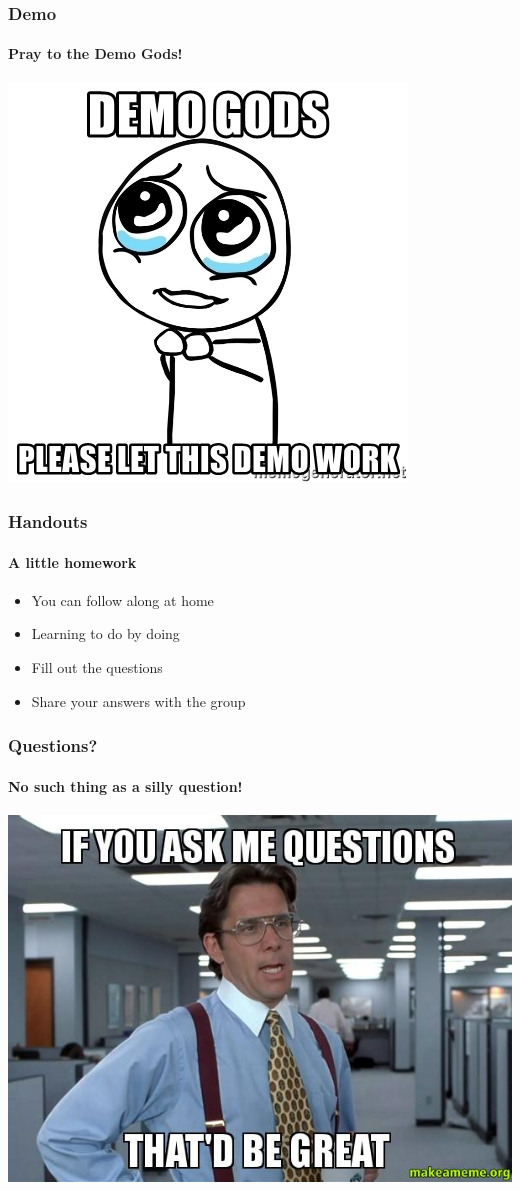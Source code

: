 \documentclass[aspectratio=169]{beamer}
\begin{document}
\begin{frame}
  \frametitle{Demo}
  \framesubtitle{Pray to the Demo Gods!}
  \begin{center}
    \includegraphics[scale=0.5]{demogods}
  \end{center}
\end{frame}

\begin{frame}
  \frametitle{Handouts}
  \framesubtitle{A little homework}
  \begin{center}
    \begin{itemize}
    \item You can follow along at home
    \item Learning to do by doing
    \item Fill out the questions
    \item Share your answers with the group
    \end{itemize}
  \end{center}
\end{frame}

\begin{frame}
  \frametitle{Questions?}
  \framesubtitle{No such thing as a silly question!}
  \begin{center}
    \includegraphics[scale=0.4]{questions}
  \end{center}
\end{frame}
\end{document}
